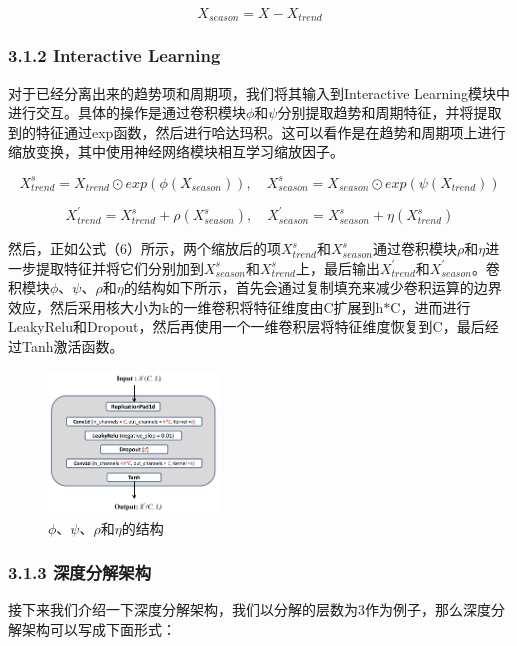 \documentclass[twoside,a4paper]{article}
\begin{document}
\begin{equation}
    X_{season} = X - X_{trend}
\end{equation}

\subsubsection*{3.1.2 Interactive Learning}

对于已经分离出来的趋势项和周期项，我们将其输入到Interactive Learning模块中进行交互。具体的操作是通过卷积模块$\phi$和$\psi$分别提取趋势和周期特征，并将提取到的特征通过exp函数，然后进行哈达玛积。这可以看作是在趋势和周期项上进行缩放变换，其中使用神经网络模块相互学习缩放因子。

\begin{equation}
    X_{trend}^s = X_{trend} \odot exp(\phi(X_{season})) , \quad
    X_{season}^s = X_{season} \odot exp(\psi(X_{trend}))
\end{equation}

\begin{equation}
    X_{trend}^{'} = X_{trend}^s + \rho(X_{season}^s)
    , \quad
    X_{season}^{'} = X_{season}^s + \eta(X_{trend}^s)
\end{equation}

然后，正如公式（6）所示，两个缩放后的项$X_{trend}^s$和$X_{season}^s$通过卷积模块$\rho$和$\eta$进一步提取特征并将它们分别加到$X_{season}^s$和$X_{trend}^s$上，最后输出$X_{trend}^{'}$和$X_{season}^{'}$。卷积模块$\phi$、$\psi$、$\rho$和$\eta$的结构如下所示，首先会通过复制填充来减少卷积运算的边界效应，然后采用核大小为k的一维卷积将特征维度由C扩展到h$*$C，进而进行LeakyRelu和Dropout，然后再使用一个一维卷积层将特征维度恢复到C，最后经过Tanh激活函数。

\begin{figure}[H]
\centering 
\includegraphics[width=0.4\textwidth]{SCINet.png} 
\caption{$\phi$、$\psi$、$\rho$和$\eta$的结构}
\end{figure}

\subsubsection*{3.1.3 深度分解架构}
接下来我们介绍一下深度分解架构，我们以分解的层数为3作为例子，那么深度分解架构可以写成下面形式：
\end{document}
